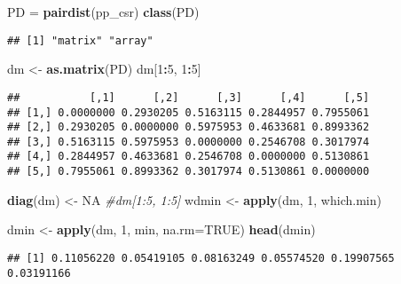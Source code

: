 \documentclass[
]{book}
\newenvironment{Shaded}{\begin{snugshade}}{\end{snugshade}}
\newcommand{\CommentTok}[1]{\textcolor[rgb]{0.56,0.35,0.01}{\textit{#1}}}
\newcommand{\DataTypeTok}[1]{\textcolor[rgb]{0.13,0.29,0.53}{#1}}
\newcommand{\DecValTok}[1]{\textcolor[rgb]{0.00,0.00,0.81}{#1}}
\newcommand{\KeywordTok}[1]{\textcolor[rgb]{0.13,0.29,0.53}{\textbf{#1}}}
\newcommand{\NormalTok}[1]{#1}
\newcommand{\OperatorTok}[1]{\textcolor[rgb]{0.81,0.36,0.00}{\textbf{#1}}}
\newcommand{\OtherTok}[1]{\textcolor[rgb]{0.56,0.35,0.01}{#1}}
\newcommand{\StringTok}[1]{\textcolor[rgb]{0.31,0.60,0.02}{#1}}
\begin{document}
\begin{Shaded}
\begin{Highlighting}[]
\NormalTok{PD =}\StringTok{ }\KeywordTok{pairdist}\NormalTok{(pp_csr)}
\KeywordTok{class}\NormalTok{(PD)}
\end{Highlighting}
\end{Shaded}

\begin{verbatim}
## [1] "matrix" "array"
\end{verbatim}

\begin{Shaded}
\begin{Highlighting}[]
\NormalTok{dm <-}\StringTok{ }\KeywordTok{as.matrix}\NormalTok{(PD)}
\NormalTok{dm[}\DecValTok{1}\OperatorTok{:}\DecValTok{5}\NormalTok{, }\DecValTok{1}\OperatorTok{:}\DecValTok{5}\NormalTok{]}
\end{Highlighting}
\end{Shaded}

\begin{verbatim}
##           [,1]      [,2]      [,3]      [,4]      [,5]
## [1,] 0.0000000 0.2930205 0.5163115 0.2844957 0.7955061
## [2,] 0.2930205 0.0000000 0.5975953 0.4633681 0.8993362
## [3,] 0.5163115 0.5975953 0.0000000 0.2546708 0.3017974
## [4,] 0.2844957 0.4633681 0.2546708 0.0000000 0.5130861
## [5,] 0.7955061 0.8993362 0.3017974 0.5130861 0.0000000
\end{verbatim}

\begin{Shaded}
\begin{Highlighting}[]
\KeywordTok{diag}\NormalTok{(dm) <-}\StringTok{ }\OtherTok{NA}
\CommentTok{#dm[1:5, 1:5]}
\NormalTok{wdmin <-}\StringTok{ }\KeywordTok{apply}\NormalTok{(dm, }\DecValTok{1}\NormalTok{, which.min)}

\NormalTok{dmin <-}\StringTok{ }\KeywordTok{apply}\NormalTok{(dm, }\DecValTok{1}\NormalTok{, min, }\DataTypeTok{na.rm=}\OtherTok{TRUE}\NormalTok{)}
\KeywordTok{head}\NormalTok{(dmin)}
\end{Highlighting}
\end{Shaded}

\begin{verbatim}
## [1] 0.11056220 0.05419105 0.08163249 0.05574520 0.19907565 0.03191166
\end{verbatim}
\end{document}

